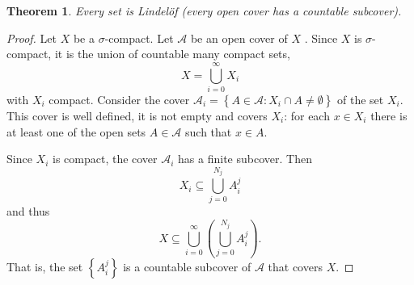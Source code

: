 \documentclass[12pt]{article}
\newtheorem{thm}{Theorem}
\begin{document}
\begin{thm} Every  set is Lindel\"of (every open cover has a
countable subcover). 
\end{thm}

\begin{proof}
Let $X$ be a $\sigma$-compact. Let $\mathcal{A}$ be an open cover of
$X$ . Since $X$ is $\sigma$-compact, it is the union of countable
many compact sets, $$X = \bigcup_{i=0}^{\infty}X_{i}$$ with $X_{i}$
compact. Consider the cover
$\mathcal{A}_{i}=\left\{A\in\mathcal{A}: X_{i}\cap A \neq \emptyset
\right\}$ of the set $X_{i}$. This cover is well defined, it is not empty and covers $X_{i}$: for each $x \in X_{i}$ there is at least one of the open sets $A\in\mathcal{A}$ such that $x \in A$.

Since $X_{i}$ is compact, the cover
$\mathcal{A}_{i}$ has a finite subcover. Then $$X_{i}\subseteq
\bigcup_{j=0}^{N_j}A_{i}^{j}$$ and thus $$X\subseteq \bigcup_{i=0}^{\infty}
\left(\bigcup_{j=0}^{N_j}A_{i}^{j}\right).$$ That is, the set
$\left\{A_{i}^{j} \right\}$ is a countable subcover of $\mathcal{A}$
that covers $X$.
\end{proof}
\end{document}
